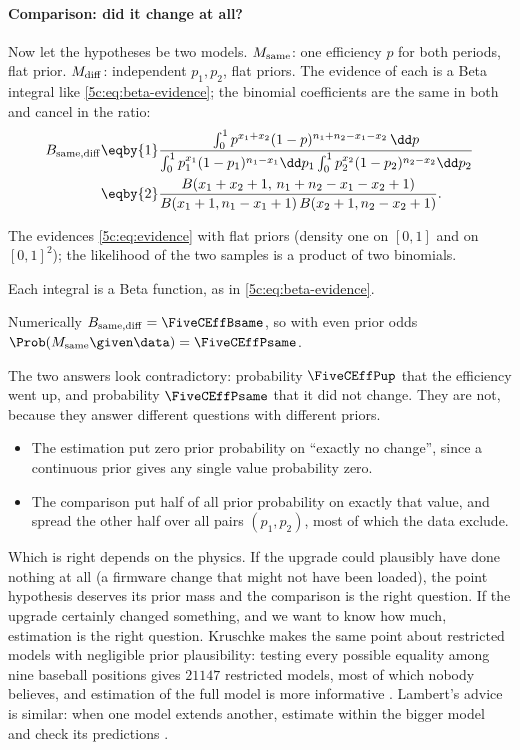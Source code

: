 \paragraph{Comparison: did it change at all?}
Now let the hypotheses be two models. $M_{\rm same}$: one efficiency $p$ for both
periods, flat prior. $M_{\rm diff}$: independent $p_1,p_2$, flat priors. The evidence of
each is a Beta integral like \eqref{5c:eq:beta-evidence}; the binomial coefficients are
the same in both and cancel in the ratio:
\begin{align}
  B_{\rm same,diff}
  &\eqby{1}\frac{\int_0^1p^{x_1+x_2}(1-p)^{n_1+n_2-x_1-x_2}\,\dd p}
     {\int_0^1p_1^{x_1}(1-p_1)^{n_1-x_1}\dd p_1\int_0^1p_2^{x_2}(1-p_2)^{n_2-x_2}\dd p_2}
   \nonumber\\
  &\eqby{2}\frac{B(x_1+x_2+1,\,n_1+n_2-x_1-x_2+1)}{B(x_1+1,n_1-x_1+1)\,B(x_2+1,n_2-x_2+1)} .
  \label{5c:eq:eff-bf}
\end{align}
\begin{explain}
  \item The evidences \eqref{5c:eq:evidence} with flat priors (density one on $[0,1]$ and
        on $[0,1]^2$); the likelihood of the two samples is a product of two binomials.
  \item Each integral is a Beta function, as in \eqref{5c:eq:beta-evidence}.
\end{explain}
Numerically $B_{\rm same,diff}=\FiveCEffBsame$, so with even prior odds
$\Prob(M_{\rm same}\given\data)=\FiveCEffPsame$.

The two answers look contradictory: probability $\FiveCEffPup$ that the efficiency went
up, and probability $\FiveCEffPsame$ that it did not change. They are not, because they
answer different questions with different priors.
\begin{itemize}[itemsep=1pt,leftmargin=1.2em]
  \item The estimation put zero prior probability on ``exactly no change'', since a
        continuous prior gives any single value probability zero.
  \item The comparison put half of all prior probability on exactly that value, and
        spread the other half over all pairs $(p_1,p_2)$, most of which the data exclude.
\end{itemize}
Which is right depends on the physics. If the upgrade could plausibly have done nothing at all (a
firmware change that might not have been loaded), the point hypothesis deserves its
prior mass and the comparison is the right question. If the upgrade certainly changed
something, and we want to know how much, estimation is the right question. Kruschke
makes the same point about restricted models with negligible prior plausibility: testing
every possible equality among nine baseball positions gives $21147$ restricted models,
most of which nobody believes, and estimation of the full model is more informative
. Lambert's advice is similar: when one model extends
another, estimate within the bigger model and check its predictions
.

